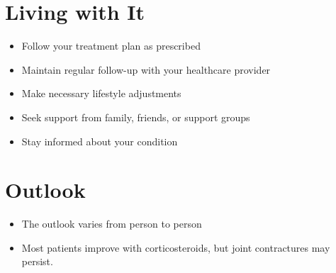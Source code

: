 \section{Living with It}
\begin{itemize}[noitemsep]
  \item Follow your treatment plan as prescribed
  \item Maintain regular follow-up with your healthcare provider
  \item Make necessary lifestyle adjustments
  \item Seek support from family, friends, or support groups
  \item Stay informed about your condition
\end{itemize}
\section{Outlook}
\begin{itemize}[noitemsep]
  \item The outlook varies from person to person
  \item Most patients improve with corticosteroids, but joint contractures may persist.
\end{itemize}
